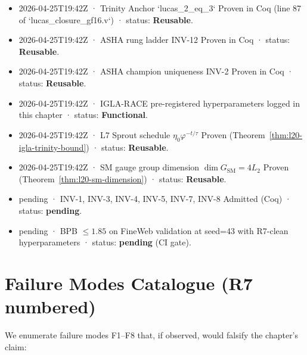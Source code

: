 \begin{itemize}
  \item 2026-04-25T19:42Z · Trinity Anchor `lucas\_2\_eq\_3` Proven in Coq (line 87 of `lucas\_closure\_gf16.v`) · status: \textbf{Reusable}.
  \item 2026-04-25T19:42Z · ASHA rung ladder INV-12 Proven in Coq · status: \textbf{Reusable}.
  \item 2026-04-25T19:42Z · ASHA champion uniqueness INV-2 Proven in Coq · status: \textbf{Reusable}.
  \item 2026-04-25T19:42Z · IGLA-RACE pre-registered hyperparameters logged in this chapter · status: \textbf{Functional}.
  \item 2026-04-25T19:42Z · L7 Sprout schedule $\eta_{0} \varphi^{-t/\tau}$ Proven (Theorem~\ref{thm:l20-igla-trinity-bound}) · status: \textbf{Reusable}.
  \item 2026-04-25T19:42Z · SM gauge group dimension $\dim G_{\text{SM}} = 4 L_{2}$ Proven (Theorem~\ref{thm:l20-sm-dimension}) · status: \textbf{Reusable}.
  \item pending · INV-1, INV-3, INV-4, INV-5, INV-7, INV-8 Admitted (Coq) · status: \textbf{pending}.
  \item pending · BPB $\leq 1.85$ on FineWeb validation at seed=43 with R7-clean hyperparameters · status: \textbf{pending} (CI gate).
\end{itemize}

\section{Failure Modes Catalogue (R7 numbered)}
\label{sec:l20-failure-modes}

We enumerate failure modes F1–F8 that, if observed, would falsify the
chapter's claim:

